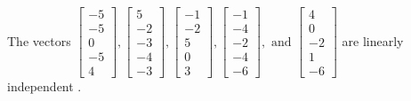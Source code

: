 \begin{exercise}
\begin{exerciseStatement}
  \end{exerciseStatement}
  \begin{exerciseAnswer}
   The vectors \(\left[\begin{array}{r}
-5 \\
-5 \\
0 \\
-5 \\
4
\end{array}\right] , \left[\begin{array}{r}
5 \\
-2 \\
-3 \\
-4 \\
-3
\end{array}\right] , \left[\begin{array}{r}
-1 \\
-2 \\
5 \\
0 \\
3
\end{array}\right] , \left[\begin{array}{r}
-1 \\
-4 \\
-2 \\
-4 \\
-6
\end{array}\right] , \text{ and } \left[\begin{array}{r}
4 \\
0 \\
-2 \\
1 \\
-6
\end{array}\right]\) are 
  	 linearly independent  .
  


  \end{exerciseAnswer}
\end{exercise}